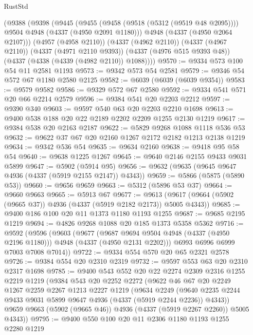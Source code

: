 \begin{lexlean}{RustStd}
\begin{coremodule}
    (@9388
      (@9398
        (@9445
          (@9455 (@9458 (@9518 (@5312 (@9519 @48 @2095)))) @9504 @4948 (@4337 (@4950 @2091 @1180)))
          @4948
          (@4337 (@4950 @2064 @2107)))
        (@4957 (@4958 @2110))
        (@4337 (@4962 @2110))
        (@4337 (@4967 @2110))
        (@4337 (@4971 @2110 @9393))
        (@4337 (@4976 @515 @9393 @48))
        (@4337 (@4338 (@4339 (@4982 @2110)) @1088))))
@9570 := @9334 @573 @100 @54 @11 @2581 @1193
@9573 := @9342 @573 @54 @2581
@9579 := @9346 @54 @572 @67 @1180 @2580 @2125
@9582 := @6039 (@6039 (@6039 @9354))
@9583 := @9579 @9582
@9586 := @9329 @572 @67 @2580
@9592 := @9334 @541 @571 @20 @66 @2214 @2579
@9596 := @9384 @541 @20 @2203 @2212
@9597 := @9390 @340
@9603 := @9597 @540 @63 @20 @2203 @2210 @1698
@9613 := @9400 @538 @188 @20 @22 @2189 @2202 @2209 @1255 @2130 @1219
@9617 := @9384 @538 @20 @2163 @2187
@9622 := @5829 @9268 @1088 @1118 @536 @53
@9632 := @9622 @37 @67 @20 @2160 @1267 @2172 @2182 @1213 @2138 @1219
@9634 := @9342 @536 @54
@9635 := @9634 @2160
@9638 := @9418 @95 @58 @54
@9640 := @9638 @1225 @1267
@9645 := @9640 @2146 @2155 @9433 @9031 @5899
@9647 := @5902 (@5914 @95)
@9656 := @9632 (@9635 (@9645 @9647 @4936 (@4337 (@5919 @2155 @2147)) @4343))
@9659 := @5866 (@5875 (@5890 @53))
@9660 := @9656 @9659
@9663 := @5312 (@5896 @53 @37)
@9664 := @9660 @9663
@9665 := @5913 @67
@9677 := @9613 (@9617 (@9664 (@5902 (@9665 @37)) @4936 (@4337 (@5919 @2182 @2173)) @5005 @4343))
@9685 := @9400 @186 @100 @20 @11 @1373 @1180 @1193 @1255
@9687 := @9685 @2195 @1219
@9694 := @4826 @9268 @1088 @20 @185 @1373 @5358 @5362
@9716 := @9592
    (@9596
      (@9603
        (@9677
          (@9687 @9694 @9504 @4948 (@4337 (@4950 @2196 @1180)))
          @4948
          (@4337 (@4950 @2131 @2202)))
        @6993
        @6996
        @6999
        @7003
        @7008
        @7014))
@9722 := @9334 @554 @570 @20 @65 @2321 @2578
@9726 := @9384 @554 @20 @2310 @2319
@9732 := @9597 @553 @63 @20 @2310 @2317 @1698
@9785 := @9400
    @543
    @552
    @20
    @22
    @2274
    @2309
    @2316
    @1255
    @2219
    @1219
    (@9384
      @543
      @20
      @2252
      @2272
      (@9622
        @46
        @67
        @20
        @2249
        @1267
        @2259
        @2267
        @1213
        @2227
        @1219
        (@9634
          @2249
          (@9640 @2235 @2244 @9433 @9031 @5899 @9647 @4936 (@4337 (@5919 @2244 @2236)) @4343))
        @9659
        @9663
        (@5902 (@9665 @46))
        @4936
        (@4337 (@5919 @2267 @2260))
        @5005
        @4343))
@9795 := @9400 @550 @100 @20 @11 @2306 @1180 @1193 @1255 @2280 @1219

\end{coremodule}
\end{lexlean}
